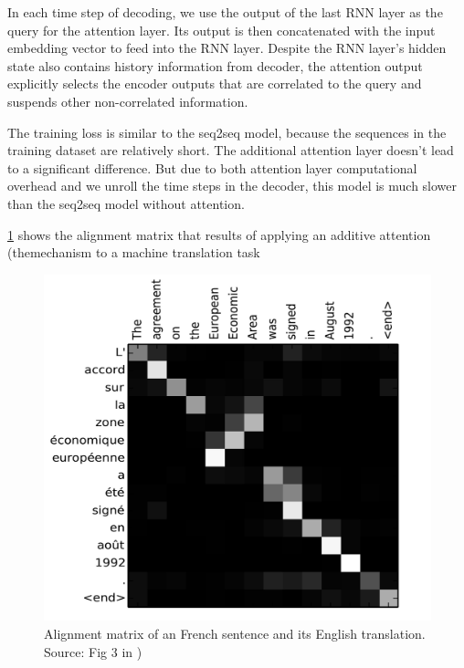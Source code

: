 In each time step of decoding, we use the output of the last RNN layer as the query for the attention layer. Its output is then concatenated with the input embedding vector to feed into the RNN layer. Despite the RNN layer's hidden state also contains history information from decoder, the attention output explicitly selects the encoder outputs that are correlated to the query and suspends other non-correlated information.

The training loss is similar to the seq2seq model, because the sequences in the training dataset are relatively short. The additional attention layer doesn’t lead to a significant difference. But due to both attention layer computational overhead and we unroll the time steps in the decoder, this model is much slower than the seq2seq model without attention.

\cref{fig:alignment-matrix} shows the alignment matrix that results of applying an additive attention (themechanism to a machine translation task

\begin{figure}[hpt]
	\centering
	\includegraphics[scale=0.45]{images/ch3/alignment-matrix.png}
	\caption{Alignment matrix of an French sentence and its English translation. Source: Fig 3 in \citep{Bahdanau2015})}
	\label{fig:alignment-matrix}
\end{figure}

